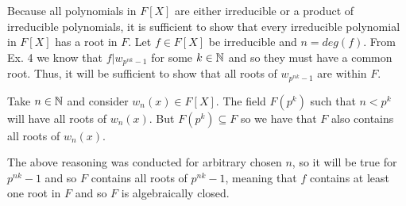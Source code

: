 \documentclass{article}
\begin{document}
Because all polynomials in $F[X]$ are either irreducible or a product of irreducible
polynomials, it is sufficient to show that every irreducible polynomial in $F[X]$ has a
root in $F$. Let $f\in F[X]$ be irreducible and $n=deg(f)$. From Ex. 4 we know that
$f|w_{p^{nk}-1}$ for some $k\in\mathbb{N}$ and so they must have a common root. Thus, it will be
sufficient to show that all roots of $w_{p^{nk}-1}$ are within $F$.

Take $n\in\mathbb{N}$ and consider $w_n(x)\in F[X]$. The field $F(p^k)$ such that
$n<p^k$ will have all roots of $w_n(x)$. But $F(p^k)\subseteq F$ so we have that $F$ also
contains all roots of $w_n(x)$.

The above reasoning was conducted for arbitrary chosen $n$, so it will be true for
$p^{nk}-1$ and so $F$ contains all roots of $p^{nk}-1$, meaning that $f$ contains at least
one root in $F$ and so $F$ is algebraically closed.


%
%
\end{document}
